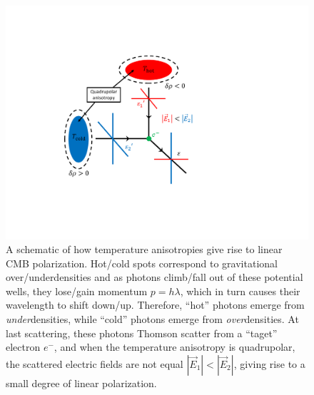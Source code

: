 \begin{figure}[!t]
    \centering
    \includegraphics[width=0.5\linewidth, trim=5cm 5cm 10cm 4.5cm, clip]{ScientificMotivation/Figures/thomson_scattering.pdf}
    \caption[Thomson scattering of CMB quadrupolar anisotropies]{A schematic of how temperature anisotropies give rise to linear CMB polarization. Hot/cold spots correspond to gravitational over/underdensities and as photons climb/fall out of these potential wells, they lose/gain momentum $p = h \lambda$, which in turn causes their wavelength to shift down/up. Therefore, ``hot'' photons emerge from \textit{under}densities, while ``cold'' photons emerge from \textit{over}densities. At last scattering, these photons Thomson scatter from a ``taget'' electron $e^{-}$, and when the temperature anisotropy is quadrupolar, the scattered electric fields are not equal $|\vec{E}_{1}| < |\vec{E}_{2}|$, giving rise to a small degree of linear polarization.}
    \label{fig:thomson_scattering}
\end{figure}

